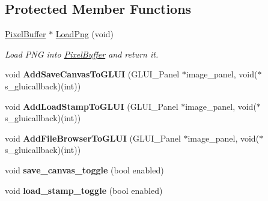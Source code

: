 \subsection*{Protected Member Functions}
\begin{DoxyCompactItemize}
\item 
\hyperlink{classimage__tools_1_1PixelBuffer}{Pixel\+Buffer} $\ast$ \hyperlink{classimage__tools_1_1IOManager_a859757de218844822b5b32967f2e28e6}{Load\+Png} (void)\hypertarget{classimage__tools_1_1IOManager_a859757de218844822b5b32967f2e28e6}{}\label{classimage__tools_1_1IOManager_a859757de218844822b5b32967f2e28e6}

\begin{DoxyCompactList}\small\item\em Load P\+NG into \hyperlink{classimage__tools_1_1PixelBuffer}{Pixel\+Buffer} and return it. \end{DoxyCompactList}\item 
void {\bfseries Add\+Save\+Canvas\+To\+G\+L\+UI} (G\+L\+U\+I\+\_\+\+Panel $\ast$image\+\_\+panel, void($\ast$s\+\_\+gluicallback)(int))\hypertarget{classimage__tools_1_1IOManager_a600cf7d9a1b1a86cbb2201fc7ec7b528}{}\label{classimage__tools_1_1IOManager_a600cf7d9a1b1a86cbb2201fc7ec7b528}

\item 
void {\bfseries Add\+Load\+Stamp\+To\+G\+L\+UI} (G\+L\+U\+I\+\_\+\+Panel $\ast$image\+\_\+panel, void($\ast$s\+\_\+gluicallback)(int))\hypertarget{classimage__tools_1_1IOManager_a39e6a658f7d97741e09c1cec9ad08396}{}\label{classimage__tools_1_1IOManager_a39e6a658f7d97741e09c1cec9ad08396}

\item 
void {\bfseries Add\+File\+Browser\+To\+G\+L\+UI} (G\+L\+U\+I\+\_\+\+Panel $\ast$image\+\_\+panel, void($\ast$s\+\_\+gluicallback)(int))\hypertarget{classimage__tools_1_1IOManager_a078d05c79a2a954c38050aa4f4985768}{}\label{classimage__tools_1_1IOManager_a078d05c79a2a954c38050aa4f4985768}

\item 
void {\bfseries save\+\_\+canvas\+\_\+toggle} (bool enabled)\hypertarget{classimage__tools_1_1IOManager_abeb5355f6d3e08847d715dc910a2236b}{}\label{classimage__tools_1_1IOManager_abeb5355f6d3e08847d715dc910a2236b}

\item 
void {\bfseries load\+\_\+stamp\+\_\+toggle} (bool enabled)\hypertarget{classimage__tools_1_1IOManager_a6d8268c033e7aee661d3a3d7ae39f13d}{}\label{classimage__tools_1_1IOManager_a6d8268c033e7aee661d3a3d7ae39f13d}


\end{DoxyCompactItemize}
